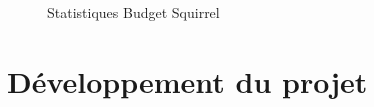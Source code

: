 \documentclass[a4paper,12pt]{article}
\begin{document}
\begin{figure}[!ht]
\noindent
{}
\caption{\footnotesize{Statistiques Budget Squirrel}}
\end{figure}

\newpage

\section{Développement du projet}
\end{document}
